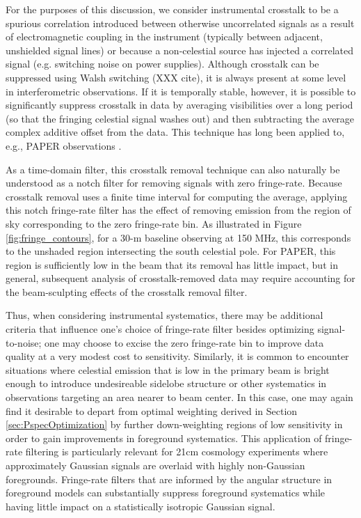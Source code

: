 \documentclass[twocolumn,apj,numberedappendix]{emulateapj}
\begin{document}
For the purposes of this discussion, we consider instrumental crosstalk to be a spurious 
correlation introduced between otherwise uncorrelated signals
as a result of electromagnetic coupling in the instrument (typically between adjacent, unshielded signal lines)
or because a non-celestial source has injected a correlated signal (e.g. switching noise on power supplies).
Although crosstalk can be suppressed using Walsh switching (XXX cite), it is always present at some level
in interferometric observations.  If it is temporally stable, however, it is possible to significantly
suppress crosstalk in data by averaging visibilities over a long period (so that the fringing celestial
signal washes out) and then subtracting the average complex additive offset from the data.  This 
technique has
long been applied to, e.g., PAPER observations \citep{parsons_et_al2010,jacobs_et_al,pober_et_al,P14}.

As a time-domain filter, this crosstalk removal technique can also naturally be understood as a notch filter
for removing signals with zero fringe-rate.  Because crosstalk removal uses a finite time interval for computing
the average, applying this notch fringe-rate filter has the effect of removing emission from the region of
sky corresponding to the zero fringe-rate bin.  As illustrated in Figure \ref{fig:fringe_contours}, for
a 30-m baseline observing at 150 MHz, this corresponds to the unshaded region intersecting the south celestial pole.
For PAPER, this region is sufficiently low in the beam that its removal has little impact, but in general, 
subsequent analysis of crosstalk-removed data may require accounting for the beam-sculpting effects of
the crosstalk removal filter.

Thus, when considering instrumental systematics, there may be additional criteria that influence one's
choice of fringe-rate filter besides optimizing signal-to-noise; one may choose to excise the zero fringe-rate
bin to improve data quality at a very modest cost to sensitivity.  Similarly, it is common to encounter situations
where celestial emission that is low in the primary beam is bright enough to introduce undesireable 
sidelobe structure or other systematics in observations targeting an area nearer to beam center.  In this case,
one may again find it desirable to depart from optimal weighting derived in Section \ref{sec:PspecOptimization}
by further down-weighting regions of low sensitivity in order to gain improvements in foreground systematics.
This application of fringe-rate filtering is particularly relevant for 21cm cosmology experiments where approximately
Gaussian signals are overlaid with highly non-Gaussian foregrounds.  Fringe-rate filters that are informed by 
the angular structure in foreground models can substantially suppress foreground systematics while having little
impact on a statistically isotropic Gaussian signal.
\end{document}
